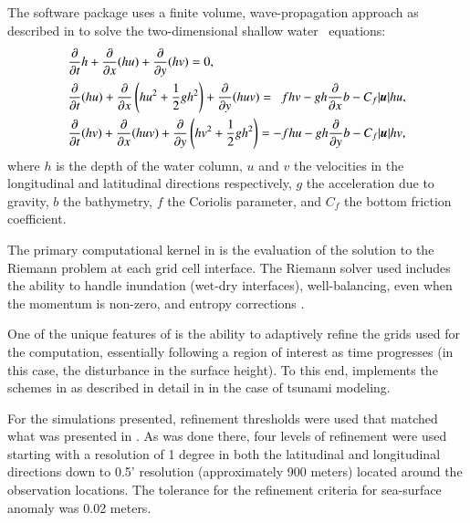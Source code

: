 \subsection{\geoclaw} \label{ssub:geoclaw}
The \geoclaw software package uses a finite volume, wave-propagation approach as
described in \cite{LeVeque:1997eg} to solve the two-dimensional shallow water \
equations:
\begin{equation} \label{eq:swe}
    \begin{aligned}
    &\pd{}{t} h + \pd{}{x} (hu) + \pd{}{y} (hv) = 0, \\
    &\pd{}{t}(hu) + \pd{}{x} \left(hu^2 + \frac{1}{2} g h^2 \right ) + \pd{}{y} (huv) = ~~ fhv - gh \pd{}{x} b - C_f |\vec{u}| hu, \\
    &\pd{}{t} (hv) + \pd{}{x} (huv) + \pd{}{y} \left (hv^2 + \frac{1}{2} gh^2 \right) = -fhu - gh \pd{}{y} b - C_f |\vec{u}| hv,
    \end{aligned}
\end{equation} 
where $h$ is the depth of the water column, $u$ and $v$ the velocities in the 
longitudinal and latitudinal directions respectively, $g$ the acceleration due 
to gravity, $b$ the bathymetry, $f$ the Coriolis parameter, and $C_f$ the bottom 
friction coefficient.  

The primary computational kernel in \geoclaw is the evaluation of the solution
to the Riemann problem at each grid cell interface.  The Riemann solver used
includes the ability to handle inundation (wet-dry interfaces), well-balancing,
even when the momentum is non-zero, and entropy corrections
\cite{George:2008aa}.

One of the unique features of \geoclaw is the ability to adaptively refine the
grids used for the computation, essentially following a region of interest as
time progresses (in this case, the disturbance in the surface height).
To this end, \geoclaw implements the schemes in \cite{Berger:1984ui,Berger:1998aa}
as described in detail in \cite{Berger:2011du} in the case of tsunami
modeling.

For the simulations presented, refinement thresholds were used that matched what
was presented in \cite{MacInnes:2013cr}.  As was done there, four levels of
refinement were used starting with a resolution of 1 degree in both the
latitudinal and longitudinal directions down to 0.5' resolution (approximately
900 meters) located around the observation locations.  The tolerance for the
refinement criteria for sea-surface anomaly was 0.02 meters.

